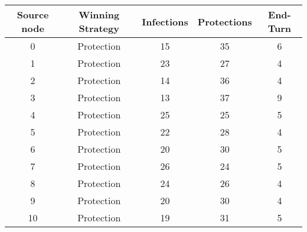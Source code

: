 \documentclass[results.tex]{subfiles}
\begin{document}
    \begin{center}
        \begin{tabular}{| c || c | c | c | c |}
            \hline
            {\bfseries Source node} & {\bfseries Winning Strategy} & {\bfseries Infections} & {\bfseries Protections}
            & {\bfseries End-Turn}
            \\  %
            \hline\hline
            0                       & Protection                   & 15                     & 35                      & 6                    \\
            \hline
            1                       & Protection                   & 23                     & 27                      & 4                    \\
            \hline
            2                       & Protection                   & 14                     & 36                      & 4                    \\
            \hline
            3                       & Protection                   & 13                     & 37                      & 9                    \\
            \hline
            4                       & Protection                   & 25                     & 25                      & 5                    \\
            \hline
            5                       & Protection                   & 22                     & 28                      & 4                    \\
            \hline
            6                       & Protection                   & 20                     & 30                      & 5                    \\
            \hline
            7                       & Protection                   & 26                     & 24                      & 5                    \\
            \hline
            8                       & Protection                   & 24                     & 26                      & 4                    \\
            \hline
            9                       & Protection                   & 20                     & 30                      & 4                    \\
            \hline
            10                      & Protection                   & 19                     & 31                      & 5                    \\

\end{tabular}
\end{center}
\end{document}
